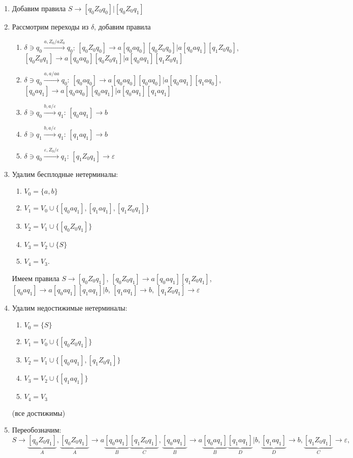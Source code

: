 \documentclass[a4paper]{article}
\begin{document}
\begin{enumerate}
\item Добавим правила $S\to [q_0Z_0q_0]|[q_0Z_0q_1]$
\item Рассмотрим переходы из $\delta$, добавим правила\begin{enumerate}
\item $\delta\ni q_0\overset{a,Z_0/aZ_0}{\longrightarrow}q_0$: $[q_0Z_0q_0]\to a[q_0aq_0][q_0Z_0q_0]\big|a[q_0aq_1][q_1Z_0q_0]$, $[q_0Z_0q_1]\to a[q_0aq_0][q_0Z_0q_1]\big|a[q_0aq_1][q_1Z_0q_1]$
\item $\delta\ni q_0\overset{a,a/aa}{\longrightarrow}q_0$: $[q_0aq_0]\to a[q_0aq_0][q_0aq_0]\big|a[q_0aq_1][q_1aq_0]$, $[q_0aq_1]\to a[q_0aq_0][q_0aq_1]\big|a[q_0aq_1][q_1aq_1]$
\item $\delta\ni q_0\overset{b,a/\varepsilon}{\longrightarrow}q_1$: $[q_0aq_1]\to b$
\item $\delta\ni q_1\overset{b,a/\varepsilon}{\longrightarrow}q_1$: $[q_1aq_1]\to b$
\item $\delta\ni q_0\overset{\varepsilon,Z_0/\varepsilon}{\longrightarrow}q_1$: $[q_1Z_0q_1]\to \varepsilon$
\end{enumerate}
\item Удалим бесплодные нетерминалы:\begin{enumerate}
\item $V_0=\{a,b\}$
\item $V_1=V_0\cup\{[q_0aq_1],[q_1aq_1],[q_1Z_0q_1]\}$
\item $V_2=V_1\cup\{[q_0Z_0q_1]\}$
\item $V_3=V_2\cup\{S\}$
\item $V_4=V_3$.
\end{enumerate}
Имеем правила $S\to [q_0Z_0q_1]$, $[q_0Z_0q_1]\to a[q_0aq_1][q_1Z_0q_1]$,  $[q_0aq_1]\to a[q_0aq_1][q_1aq_1]\big|b$, $[q_1aq_1]\to b$, $[q_1Z_0q_1]\to \varepsilon$
\item Удалим недостижимые нетерминалы:\begin{enumerate}
\item $V_0=\{S\}$
\item $V_1=V_0\cup\{[q_0Z_0q_1]\}$
\item $V_2=V_1\cup\{[q_0aq_1],[q_1Z_0q_1]\}$
\item $V_3=V_2\cup\{[q_1aq_1]\}$
\item $V_4=V_3$
\end{enumerate}
(все достижимы)
\item Переобозначим: $$S\to \underbrace{[q_0Z_0q_1]}_A, \underbrace{[q_0Z_0q_1]}_A\to a\underbrace{[q_0aq_1]}_B\underbrace{[q_1Z_0q_1]}_C, \underbrace{[q_0aq_1]}_B\to a\underbrace{[q_0aq_1]}_B\underbrace{[q_1aq_1]}_D\big|b, \underbrace{[q_1aq_1]}_D\to b, \underbrace{[q_1Z_0q_1]}_C\to \varepsilon,$$

\end{enumerate}
\end{document}
